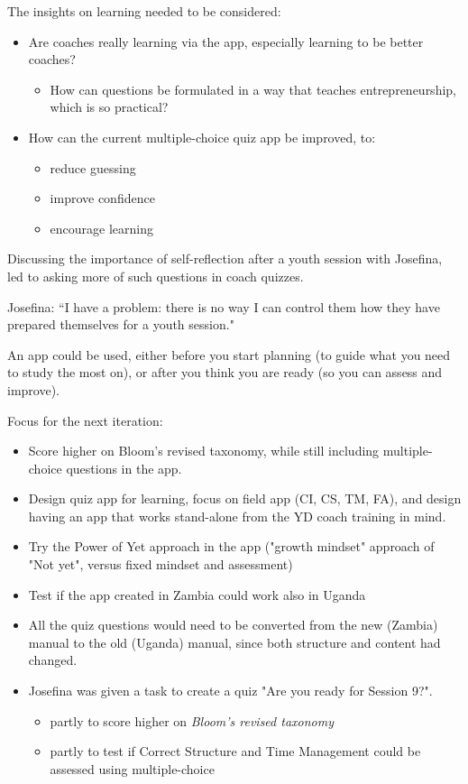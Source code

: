 The insights on learning needed to be considered:
\begin{itemize}
  \item Are coaches really learning via the app, especially learning to be better coaches?
  \begin{itemize}
    \item How can questions be formulated in a way that teaches entrepreneurship, which is so practical?
  \end{itemize}
  \item How can the current multiple-choice quiz app be improved, to:
  \begin{itemize}
  \item reduce guessing
  \item improve confidence
  \item encourage learning
  \end{itemize}
\end{itemize}

Discussing the importance of self-reflection after a youth session with Josefina, led to asking more of such questions in coach quizzes.

Josefina: “I have a problem: there is no way I can control them how they have prepared themselves for a youth session."

An app could be used, either before you start planning (to guide what you need to study the most on), or after you think you are ready (so you can assess and improve).

Focus for the next iteration:
\begin{itemize}
  \item Score higher on Bloom's revised taxonomy, while still including multiple-choice questions in the app.
  \item Design quiz app for learning, focus on field app (CI, CS, TM, FA), and design having an app that works stand-alone from the YD coach training in mind.
  \item Try the Power of Yet approach in the app ("growth mindset" approach of "Not yet", versus fixed mindset and assessment)
  \item Test if the app created in Zambia could work also in Uganda
  \item All the quiz questions would need to be converted from the new (Zambia) manual to the old (Uganda) manual, since both structure and content had changed.
  \item Josefina was given a task to create a quiz "Are you ready for Session 9?".
  \begin{itemize}
    \item partly to score higher on \textit{Bloom's revised taxonomy}
    \item partly to test if Correct Structure and Time Management could be assessed using multiple-choice
  \end{itemize}
\end{itemize}

